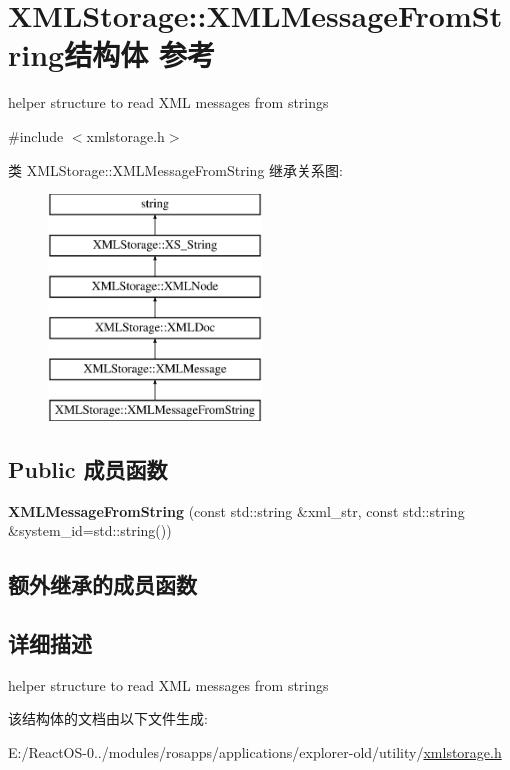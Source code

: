 \hypertarget{struct_x_m_l_storage_1_1_x_m_l_message_from_string}{}\section{X\+M\+L\+Storage\+:\+:X\+M\+L\+Message\+From\+String结构体 参考}
\label{struct_x_m_l_storage_1_1_x_m_l_message_from_string}


helper structure to read X\+ML messages from strings  




{\ttfamily \#include $<$xmlstorage.\+h$>$}

类 X\+M\+L\+Storage\+:\+:X\+M\+L\+Message\+From\+String 继承关系图\+:\begin{figure}[H]
\begin{center}
\leavevmode
\includegraphics[height=6.000000cm]{struct_x_m_l_storage_1_1_x_m_l_message_from_string}
\end{center}
\end{figure}
\subsection*{Public 成员函数}
\begin{DoxyCompactItemize}
\item 
\mbox{\label{struct_x_m_l_storage_1_1_x_m_l_message_from_string_a810c654996727e4dd033a5da8e1df982}} 
{\bfseries X\+M\+L\+Message\+From\+String} (const std\+::string \&xml\+\_\+str, const std\+::string \&system\+\_\+id=std\+::string())
\end{DoxyCompactItemize}
\subsection*{额外继承的成员函数}


\subsection{详细描述}
helper structure to read X\+ML messages from strings 

该结构体的文档由以下文件生成\+:\begin{DoxyCompactItemize}
\item 
E\+:/\+React\+O\+S-\/0../modules/rosapps/applications/explorer-\/old/utility/\hyperlink{xmlstorage_8h}{xmlstorage.\+h}\end{DoxyCompactItemize}

